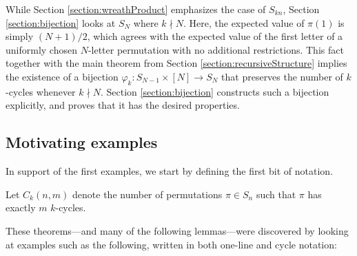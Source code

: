 While Section \ref{section:wreathProduct} emphasizes the case of $S_{kn}$,
Section \ref{section:bijection} looks at $S_N$ where $k \nmid N$. Here, the
expected value of $\pi(1)$ is simply $(N+1)/2$, which agrees with the expected
value of the first letter of a uniformly chosen $N$-letter permutation with
no additional restrictions. This fact together with the main
theorem from Section \ref{section:recursiveStructure} implies the existence of a
bijection $\varphi_k \colon S_{N-1} \times [N] \rightarrow S_N$ that preserves the
number of $k$-cycles whenever $k \nmid N$. Section \ref{section:bijection}
constructs such a bijection explicitly, and proves that it has the desired
properties.

\subsection{Motivating examples}

In support of the first examples, we start by defining the first bit of notation.
\begin{definition}
  Let $C_k(n,m)$ denote the number of permutations $\pi \in S_n$ such that
  $\pi$ has exactly $m$ $k$-cycles.
\end{definition}

These theorems---and many of the following lemmas---were discovered by looking
at examples such as the following, written in both one-line and cycle notation:

